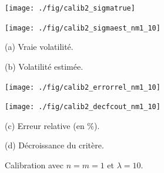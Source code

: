 \begin{figure}[!htbp]

\begin{center}
\begin{minipage}{5.8cm}
\centerline{\texttt{[image: ./fig/calib2\_sigmatrue]}
} 
\end{minipage}
\hspace*{0.1cm}
\begin{minipage}{5.8cm}
\centerline{\texttt{[image: ./fig/calib2\_sigmaest\_nm1\_10]}
}
\end{minipage}
\end{center}

\begin{center}
\begin{minipage}{5.8cm}
(a) Vraie volatilit\'e.
\end{minipage}
\hspace*{0.1cm}
\begin{minipage}{5.8cm}
(b) Volatilit\'e estim\'ee.
\end{minipage}
\end{center}

\medskip

\begin{center}
\begin{minipage}{5.8cm}
\centerline{\texttt{[image: ./fig/calib2\_errorrel\_nm1\_10]}
}
\end{minipage}
\hspace*{0.1cm}
\begin{minipage}{5.8cm}
\centerline{\texttt{[image: ./fig/calib2\_decfcout\_nm1\_10]}
}
\end{minipage}
\end{center}

\begin{center}
\begin{minipage}{5.8cm}
(c) Erreur relative (en \%).
\end{minipage}
\hspace*{0.1cm}
\begin{minipage}{5.8cm}
(d) D\'ecroissance du crit\`ere.
\end{minipage}
\end{center}

\caption{Calibration avec $n = m = 1$ et $\lambda = 10$.}
\label{FIG:CALIB2_NM1_10}
\end{figure}

\pagebreak

